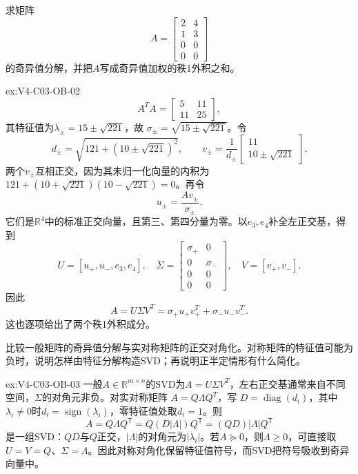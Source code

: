 \begin{SLChapterExercisePairSection}
\begin{exercise}\label{ex:V4-C03-OB-02}
求矩阵
\[
A=\begin{bmatrix}2&4\\1&3\\0&0\\0&0\end{bmatrix}
\]
的奇异值分解，并把$A$写成奇异值加权的秩1外积之和。
\end{exercise}
\ifSLFullEdition
{}\label{sol:V4-C03-OB-02}
\begin{chapterexercisesolution}{ex:V4-C03-OB-02}
\[
A^TA=\begin{bmatrix}5&11\\11&25\end{bmatrix},
\]
其特征值为$\lambda_\pm=15\pm\sqrt{221}$，故
$\sigma_\pm=\sqrt{15\pm\sqrt{221}}$。令
\[
d_\pm=\sqrt{121+(10\pm\sqrt{221})^2},\qquad
v_\pm=\frac1{d_\pm}
\begin{bmatrix}11\\10\pm\sqrt{221}\end{bmatrix}.
\]
两个$v_\pm$互相正交，因为其未归一化向量的内积为
$121+(10+\sqrt{221})(10-\sqrt{221})=0$。再令
\[
u_\pm=\frac{Av_\pm}{\sigma_\pm}.
\]
它们是$\mathbb R^4$中的标准正交向量，且第三、第四分量为零。以$e_3,e_4$补全左正交基，得到
\[
U=[u_+,u_-,e_3,e_4],\quad
\Sigma=\begin{bmatrix}\sigma_+&0\\0&\sigma_-\\0&0\\0&0\end{bmatrix},
\quad V=[v_+,v_-].
\]
因此
\[
A=U\Sigma V^T
=\sigma_+u_+v_+^T+\sigma_-u_-v_-^T.
\]
这也逐项给出了两个秩1外积成分。
\end{chapterexercisesolution}
\fi

\begin{exercise}\label{ex:V4-C03-OB-03}
比较一般矩阵的奇异值分解与实对称矩阵的正交对角化。对称矩阵的特征值可能为负时，说明怎样由特征分解构造SVD；再说明正半定情形有什么简化。
\end{exercise}
\ifSLFullEdition
{}\label{sol:V4-C03-OB-03}
\begin{chapterexercisesolution}{ex:V4-C03-OB-03}
一般$A\in\mathbb R^{m\times n}$的SVD为$A=U\Sigma V^T$，左右正交基通常来自不同空间，$\Sigma$的对角元非负。对实对称矩阵
$A=Q\Lambda Q^T$，写
$D=\operatorname{diag}(d_i)$，其中$\lambda_i\ne0$时$d_i=\operatorname{sign}(\lambda_i)$，零特征值处取$d_i=1$。则
\[
A=Q\Lambda Q^{\mathsf T}
=Q(D|\Lambda|)Q^{\mathsf T}
=(QD)|\Lambda|Q^{\mathsf T}
\]
是一组SVD：$QD$与$Q$正交，$|\Lambda|$的对角元为$|\lambda_i|$。若$A\succeq0$，则$\Lambda\ge0$，可直接取$U=V=Q$、$\Sigma=\Lambda$。因此对称对角化保留特征值符号，而SVD把符号吸收到奇异向量中。
\end{chapterexercisesolution}
\fi


\end{SLChapterExercisePairSection}
